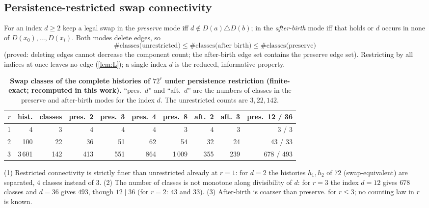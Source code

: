 \subsection{Persistence-restricted swap connectivity}
For an index $d\ge2$ keep a legal swap in the \emph{preserve} mode iff $d\notin D(a)\triangle D(b)$; in the \emph{after-birth} mode iff that holds or $d$ occurs in none of $D(x_0),\dots,D(x_i)$. Both modes delete edges, so
\[\#\text{classes(unrestricted)}\le\#\text{classes(after birth)}\le\#\text{classes(preserve)}\]
(proved: deleting edges cannot decrease the component count; the after-birth edge set contains the preserve edge set). Restricting by all indices at once leaves no edge (\cref{lem:L}); a single index $d$ is the reduced, informative property.
\begin{table}[tbp]\centering\small
\begin{tabular}{@{}rrrrrrrrrr@{}}\toprule
$r$ & hist. & classes & pres.\ 2 & pres.\ 3 & pres.\ 4 & pres.\ 8 & aft.\ 2 & aft.\ 3 & pres.\ 12 / 36\\\midrule
1 & 4 & 3 & 4 & 4 & 4 & 3 & 4 & 3 & 3 / 3\\
2 & 100 & 22 & 36 & 51 & 62 & 54 & 32 & 24 & 43 / 33\\
3 & 3\,601 & 142 & 413 & 551 & 864 & 1\,009 & 355 & 239 & 678 / 493\\\bottomrule
\end{tabular}
\caption{\textbf{Swap classes of the complete histories of $72^r$ under persistence restriction (finite-exact; recomputed in this work).} ``pres.\ $d$'' and ``aft.\ $d$'' are the numbers of classes in the preserve and after-birth modes for the index $d$. The unrestricted counts are $3,22,142$.}\label{tab:persist}
\end{table}
\begin{proposition}\label{prop:persist}
(1) Restricted connectivity is strictly finer than unrestricted already at $r=1$: for $d=2$ the histories $h_1,h_2$ of $72$ (swap-equivalent) are separated, $4$ classes instead of $3$. (2) The number of classes is not monotone along divisibility of $d$: for $r=3$ the index $d=12$ gives $678$ classes and $d=36$ gives $493$, though $12\mid36$ (for $r=2$: $43$ and $33$). (3) After-birth is coarser than preserve.  for $r\le3$; no counting law in $r$ is known.
\end{proposition}

